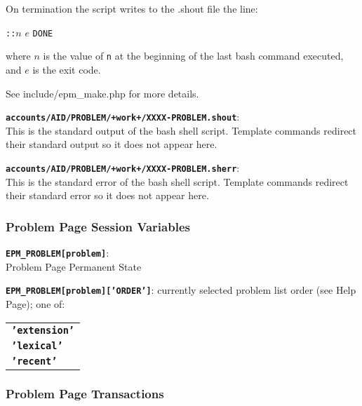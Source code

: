 \documentclass[12pt]{article}
\newenvironment{indpar}[1][0.4in]%
	{\begin{list}{}%
		     {\setlength{\itemsep}{0in}%
		      \setlength{\topsep}{0in}%
		      \setlength{\parsep}{1ex}%
		      \setlength{\labelwidth}{#1}%
		      \setlength{\leftmargin}{#1}%
		      \addtolength{\leftmargin}{\labelsep}}%
	 \item}%
	{\end{list}}
\newenvironment{itemlist}[1][0.2in]%
	{\begin{list}{}{\setlength{\labelwidth}{#1}%
		        \setlength{\leftmargin}{\labelwidth}%
		        \addtolength{\leftmargin}{+0.2in}%
		        \addtolength{\linewidth}{-\labelwidth}%
		        \addtolength{\linewidth}{-0.2in}%
		        \renewcommand{\makelabel}[1]{##1\hfill}}
	 \raggedright}%
	{\end{list}}
\newcommand{\TT}[1]{{\tt \bfseries #1}}
\begin{document}
\begin{indpar}
\begin{itemlist}
On termination the script writes to the .shout file the line:
\begin{center}
{\tt ::}$n$ $e$ {\tt DONE}
\end{center}
where $n$ is the value of {\tt n} at the beginning of the
last bash command executed, and $e$ is the exit code.

See include/epm\_make.php for more details.

\item[\TT{accounts/AID/PROBLEM/+work+/XXXX-PROBLEM.shout}:]~ \\
This is the standard output of the bash shell script.
Template commands redirect their standard output so it does not appear here.
\item[\TT{accounts/AID/PROBLEM/+work+/XXXX-PROBLEM.sherr}:]~ \\
This is the standard error of the bash shell script.
Template commands redirect their standard error so it does not appear here.
\end{itemlist}
\end{indpar}

\subsubsection{Problem Page Session Variables}

\begin{indpar}
\begin{itemlist}
\item[\TT{EPM\_PROBLEM[problem]}:] ~
\label{EPM_PROBLEM} \\
    Problem Page Permanent State
\item[\TT{EPM\_PROBLEM[problem]['ORDER']}:]
    currently selected problem list order (see Help Page); one of:
    \begin{tabular}[t]{l}
    \TT{'extension'} \\
    \TT{'lexical'} \\
    \TT{'recent'} 
    \end{tabular}
\end{itemlist}
\end{indpar}

\subsubsection{Problem Page Transactions}
\end{document}

